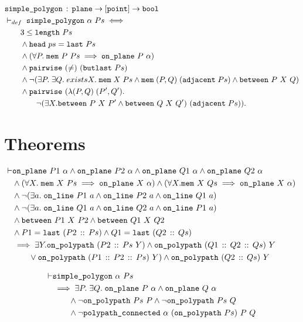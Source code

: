\begin{align*}
  &\texttt{simple\_polygon}\,:\,\texttt{plane} \rightarrow [\texttt{point}] \rightarrow \texttt{bool}\\
  &\vdash_{def}\;\texttt{simple\_polygon}\ \alpha\ Ps \iff \\
  &\qquad 3 \leq \texttt{length}\ Ps\\
  &\qquad\wedge \texttt{head}\ ps = \texttt{last}\ Ps\\
  &\qquad\wedge (\forall P.\;\texttt{mem}\ P\ Ps \implies \texttt{on\_plane}\ P\ \alpha)\\
  &\qquad\wedge \texttt{pairwise}\ (\neq)\ (\texttt{butlast}\ Ps)\\
  &\qquad\wedge \neg(\exists P.\;\exists Q.\;exists X.\; \texttt{mem}\;X\;Ps\wedge\texttt{mem}\;(P,Q)\;(\texttt{adjacent}\;Ps)\wedge\texttt{between}\ P\ X\ Q)\\
  &\qquad\wedge \texttt{pairwise}\ (\lambda(P,Q)\;(P',Q').\\
  &\qquad\qquad\neg(\exists X. \texttt{between}\ P\ X\ P' \wedge \texttt{between}\ Q\ X\ Q')\ (\texttt{adjacent}\;Ps)).
\end{align*}

\section{Theorems}
\begin{align*}
\vdash &\code{on\_plane}\ P1\ \alpha \wedge \code{on\_plane}\ P2\ \alpha \wedge \code{on\_plane}\ Q1\ \alpha \wedge \code{on\_plane}\ Q2\ \alpha\\
       &\wedge(\forall X.\;\code{mem}\ X\ Ps \implies \code{on\_plane}\ X\ \alpha) \wedge (\forall X. \code{mem}\ X\ Qs \implies \code{on\_plane}\ X\ \alpha)\\
       &\wedge\Triangle{a}{P1}{P2}{Q1}\\
       &\wedge\Triangle{a}{Q1}{Q2}{P1}\\
       &\wedge\code{between}\ P1\ X\ P2 \wedge \code{between}\ Q1\ X\ Q2\\
       &\wedge P1 = \code{last}\ (\cons{P2}{Ps}) \wedge Q1 = \code{last}\ (\cons{Q2}{Qs})\\
       &\implies \exists Y. \code{on\_polypath}\ (\cons{P2}{Ps}\ Y) \wedge \code{on\_polypath}\ (\cons{Q1}{\cons{Q2}{Qs}})\ Y\\
       &\qquad\vee \code{on\_polypath}\ (\cons{P1}{\cons{P2}{Ps}})\ Y) \wedge \code{on\_polypath}\ (\cons{Q2}{Qs})\ Y
\end{align*}

\begin{align*}
\vdash &\code{simple\_polygon}\ \alpha\ Ps\\
       &\implies \exists P.\;\exists Q.\; \code{on\_plane}\ P\ \alpha \wedge \code{on\_plane}\ Q\ \alpha\\
       &\qquad\wedge \neg\code{on\_polypath}\ Ps\ P \wedge \neg\code{on\_polypath}\ Ps\ Q\\
       &\qquad\wedge \neg\code{polypath\_connected}\ \alpha\ (\code{on\_polypath}\ Ps)\ P\ Q
\end{align*}

